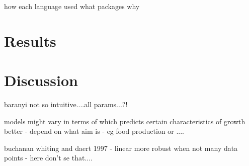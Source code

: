 \documentclass[11pt]{article}
\begin{document}
\begin{linenumbers}
            how each language used
            what packages
            why
        

    \section{Results}


    \section{Discussion}

        baranyi not so intuitive....all params...?!
        
        models might vary in terms of which predicts certain characteristics of growth better - depend on what aim is - eg food production or ....
        
        buchanan whiting and daert 1997 - linear more robust when not many data points - here don't se that....

    \end{linenumbers}
  
    
    
\end{document}
